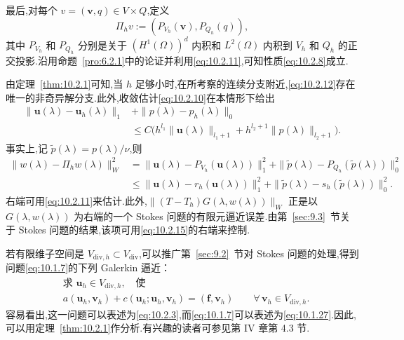 最后,对每个 \(v=(\boldsymbol{v},q)\in V\times Q\),定义
\[
  \Pi_hv:=(P_{V_h}(\boldsymbol{v}),P_{Q_h}(q)),
\]
其中 \(P_{V_h}\) 和 \(P_{Q_h}\) 分别是关于 \((H^1(\Omega))^d\) 内积和 \(L^2(\Omega)\) 内积到 \(V_h\) 和 \(Q_h\) 的正交投影.沿用命题~\ref{pro:6.2.1}中的论证并利用\eqref{eq:10.2.11},可知性质\eqref{eq:10.2.8}成立.

由定理~\ref{thm:10.2.1}可知,当 \(h\) 足够小时,在所考察的连续分支附近,\eqref{eq:10.2.12}存在唯一的非奇异解分支.此外,收敛估计\eqref{eq:10.2.10}在本情形下给出
\begin{equation}\label{eq:10.2.15}
  \begin{aligned}
    \|\boldsymbol{u}(\lambda)-\boldsymbol{u}_h(\lambda)\|_1
      &+\|p(\lambda)-p_h(\lambda)\|_0\\
      &\le C\bigl(h^{l_1}\|\boldsymbol{u}(\lambda)\|_{l_1+1}
                    +h^{l_2+1}\|p(\lambda)\|_{l_2+1}\bigr).
  \end{aligned}
\end{equation}
事实上,记 \(\widetilde p(\lambda)=p(\lambda)/\nu\),则
\[
  \begin{aligned}
    \|w(\lambda)-\Pi_hw(\lambda)\|_W^2
      &=\|\boldsymbol{u}(\lambda)-P_{V_h}(\boldsymbol{u}(\lambda))\|_1^2
             +\|\widetilde p(\lambda)-P_{Q_h}(\widetilde p(\lambda))\|_0^2\\
      &\le\|\boldsymbol{u}(\lambda)-r_h(\boldsymbol{u}(\lambda))\|_1^2
             +\|\widetilde p(\lambda)-s_h(\widetilde p(\lambda))\|_0^2.
  \end{aligned}
\]
右端可用\eqref{eq:10.2.11}来估计.此外,\(\|(T-T_h)G(\lambda,w(\lambda))\|_W\) 正是以 \(G(\lambda,w(\lambda))\) 为右端的一个 Stokes 问题的有限元逼近误差.由第~\ref{sec:9.3}~节关于 Stokes 问题的结果,该项可用\eqref{eq:10.2.15}的右端来控制.

若有限维子空间是 \(V_{\mathrm{div},h}\subset V_{\mathrm{div}}\),可以推广第~\ref{sec:9.2}~节对 Stokes 问题的处理,得到问题\eqref{eq:10.1.7}的下列 Galerkin 逼近：
\[
  \begin{aligned}
    &\text{求 }\boldsymbol{u}_h\in V_{\mathrm{div},h},\quad\text{使}\\
    &a(\boldsymbol{u}_h,\boldsymbol{v}_h)+c(\boldsymbol{u}_h;\boldsymbol{u}_h,\boldsymbol{v}_h)
         =(\boldsymbol{f},\boldsymbol{v}_h)\qquad\forall\,\boldsymbol{v}_h\in V_{\mathrm{div},h}.
  \end{aligned}
\]
容易看出,这一问题可以表述为\eqref{eq:10.2.3},而\eqref{eq:10.1.7}可以表述为\eqref{eq:10.1.27}.因此,可以用定理~\ref{thm:10.2.1}作分析.有兴趣的读者可参见第 IV 章第 4.3 节.

